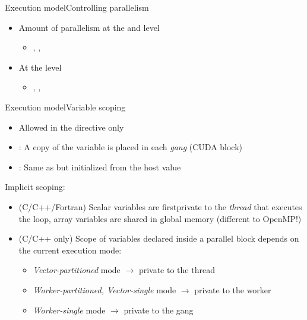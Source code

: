 \documentclass[12pt,aspectratio=169]{beamer}
\begin{document}
\begin{frame}[fragile]{Execution model}{Controlling parallelism}
  \begin{itemize}
  \item Amount of parallelism at the  and
     level
    \begin{itemize}
    \item {}, ,
    \end{itemize}
  \item At the  level
    \begin{itemize}
    \item {}, , 
    \end{itemize}
  \end{itemize}

\end{frame}

\begin{frame}[fragile]{Execution model}{Variable scoping}
  \begin{itemize}
  \item Allowed in the  directive only
  \item {}: A copy of the variable is placed in each \emph{gang} (CUDA block)
  \item {}: Same as  but initialized from the host value
  \end{itemize}
  \pause
  Implicit scoping:
  \begin{itemize}
  \item (C/C++/Fortran) Scalar variables are firstprivate to the \emph{thread} that executes the loop, array variables are shared in global memory (different to OpenMP!)
  \item (C/C++ only) Scope of variables declared inside a parallel block depends on the current execution mode:
    \begin{itemize}
    \item \emph{Vector-partitioned} mode $\rightarrow$ private to the thread
    \item \emph{Worker-partitioned, Vector-single} mode $\rightarrow$ private to the worker
    \item \emph{Worker-single} mode $\rightarrow$ private to the gang
    \end{itemize}
  \end{itemize}
\end{frame}
\end{document}
